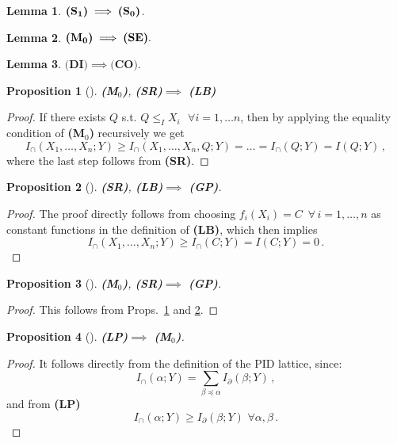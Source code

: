 \documentclass{article}
\newcommand{\ts}[1]{\ensuremath{_{\text{#1}}}}
\newcommand{\Xs}{X_1,\ldots,X_n}
\newcommand{\SR}{\textbf{(SR)}\xspace} %
\newcommand{\Sz}{\textbf{(S\ts{0})}\xspace} %
\newcommand{\Mz}{\textbf{(M\ts{0})}\xspace} %
\newcommand{\GP}{\textbf{(GP)}\xspace} %
\newcommand{\So}{\textbf{(S\ts{1})}\xspace} %
\newcommand{\CO}{\textbf{(CO)}\xspace} %
\newcommand{\LB}{\textbf{(LB)}\xspace} %
\newcommand{\SE}{\textbf{(SE)}\xspace} %
\newcommand{\LP}{\textbf{(LP)}\xspace}
\newcommand{\DI}{\textbf{(DI)}\xspace}
\newtheorem{lemma}{Lemma}
\newtheorem{proposition}{Proposition}
\begin{document}
\begin{lemma} \label{lemma:So--Sz}
    $\So \implies \Sz$.
\end{lemma}

\begin{lemma} \label{lemma:Mz--Mo}
    $\Mz \implies \SE.$
\end{lemma}

\begin{lemma} \label{lemma:DI--CO}
    $\DI \implies \CO.$
\end{lemma}

\begin{proposition}[\!\!\cite{griffith2014intersection}] \label{prop:M0-SR--LB}
    \Mz, \SR $\implies$ \LB
\end{proposition}
\begin{proof}
    If there exists $Q$ s.t. $Q\leq_I X_i\,\,\,\,\forall i =1,\ldots n$, then by applying the equality condition of \Mz recursively we get
    \begin{equation}
        I_\cap(X_1,\ldots,X_n;Y) \geq I_\cap(X_1,\ldots,X_n,Q;Y) = \ldots = I_\cap(Q;Y) = I(Q;Y) \,,
    \end{equation}
    where the last step follows from \SR.
\end{proof}

\begin{proposition}[\!\!\cite{williams2010nonnegative}] \label{prop:LB-SR--GP}
    \SR, \LB $\implies$ \GP.
\end{proposition}
\begin{proof}
    The proof directly follows from choosing $f_i(X_i)=C\,\,\,\forall \,i=1,\ldots,n$ as constant functions in the definition of \LB, which then implies
    \begin{equation}
        I_\cap(\Xs;Y) \ge I_\cap(C;Y) = I(C;Y) = 0 \,.
    \end{equation}
\end{proof}

\begin{proposition}[\!\!\cite{williams2010nonnegative}] \label{prop:Mz-SR--GP}
    \Mz, \SR $\implies$ \GP.
\end{proposition}
\begin{proof}
This follows from Props.~\ref{prop:M0-SR--LB} and \ref{prop:LB-SR--GP}.
\end{proof}

\begin{proposition}[\!\!\cite{williams2010nonnegative, gutknecht2025babel, matthias2025novel}] \label{prop:LP--M0}
    \LP $\implies$ \Mz.
\end{proposition}
\begin{proof}
    It follows directly from the definition of the PID lattice, since:
    \begin{equation}
        I_\cap(\alpha;Y) = \sum_{\beta\preceq\alpha} I_\partial(\beta;Y) \,,
    \end{equation}
    and from \LP
    \begin{equation}
        I_\cap(\alpha;Y) \ge I_\partial(\beta;Y) \,\,\forall \alpha,\beta\,.
    \end{equation}
\end{proof}
\end{document}
